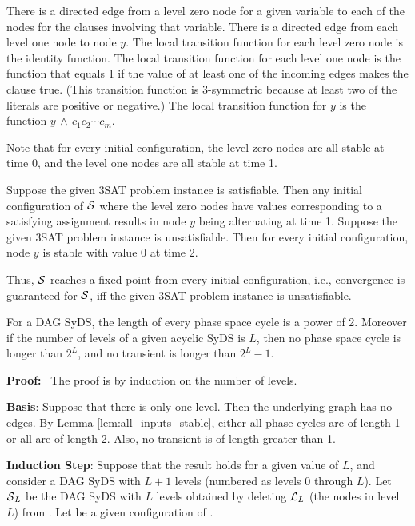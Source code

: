 There is a directed edge from a  level zero node for a given variable 
to each of  the nodes for the clauses involving that variable.
There is a directed edge from each level one node to node $y$.
The local transition function for each level zero node is the identity function.
The local transition function for each level one node is the function that equals 1
 if the value of at least one of the incoming edges
makes the clause true. 
(This transition function is 3-symmetric because at least two of the literals are positive or negative.)
The local transition function for $y$ is the function $\bar{y} \, \wedge \, c_1 c_2 \cdots  c_{m}$.

Note that for every initial configuration, the level zero nodes are all stable at time 0,
and the level one nodes are all stable at time 1.

\smallskip
Suppose the given 3SAT problem instance is satisfiable.
Then any initial configuration of $\mbox{$\mathcal{S}$}$ where the level zero nodes 
have values corresponding to a satisfying assignment
results in node $y$ being alternating at time 1.
Suppose the given 3SAT problem instance is unsatisfiable.
Then for every initial configuration, node $y$ is stable with value 0 at time 2.

\smallskip
Thus, $\mbox{$\mathcal{S}$}$ reaches a fixed point from every initial configuration, 
i.e.,  convergence is guaranteed for $\mbox{$\mathcal{S}$}$,
iff the given 3SAT problem instance is unsatisfiable.
\QED
\fi

\begin{theorem}\label{thm:levels_phase_space}
For a DAG SyDS,
the length of every phase space cycle is a power of 2.
Moreover if the number of levels of a given acyclic SyDS is $L$,
then no phase space cycle is longer than $2^L$,
and no transient is longer than $2^L-1$.
\end{theorem}

\noindent
\textbf{Proof:}~ 
The proof is by induction on the number of levels.

{\bf Basis}: Suppose that there is only one level.
Then the underlying  graph has no edges.
By Lemma \ref{lem:all_inputs_stable},
either all phase cycles are of length 1 or all are of length 2. 
Also, no transient is of length greater than 1.

{\bf Induction Step}: Suppose that the result holds for a given value of $L$,
and consider a DAG SyDS \cals{} with $L+1$ levels (numbered as levels 0 through $L$).
Let $\mbox{$\mathcal{S}$}_L$ be the DAG SyDS with $L$ levels obtained 
by deleting $\mbox{$\mathcal{L}$}_L$ (the nodes in level $L$) from \cals{}.
Let \calc{} be a given configuration of \cals{}.

